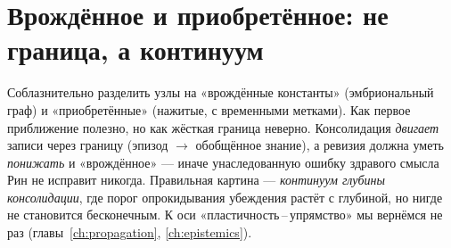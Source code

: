 \section{Врождённое и приобретённое: не граница, а континуум}

Соблазнительно разделить узлы на «врождённые константы» (эмбриональный граф) и
«приобретённые» (нажитые, с временными метками). Как первое приближение полезно, но
как жёсткая граница неверно. Консолидация \emph{двигает} записи через границу
(эпизод $\to$ обобщённое знание), а ревизия должна уметь \emph{понижать} и
«врождённое» — иначе унаследованную ошибку здравого смысла Рин не исправит никогда.
Правильная картина — \emph{континуум глубины консолидации}, где порог опрокидывания
убеждения растёт с глубиной, но нигде не становится бесконечным. К оси
«пластичность\,--\,упрямство» мы вернёмся не раз (главы~\ref{ch:propagation},
\ref{ch:epistemics}).
